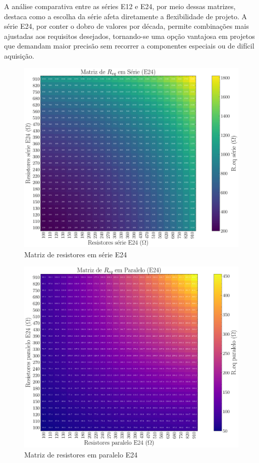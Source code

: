 \documentclass[conference]{IEEEtran}
\begin{document}
A análise comparativa entre as séries E12 e E24, por meio dessas matrizes, destaca como a escolha da série afeta diretamente a flexibilidade de projeto. A série E24, por conter o dobro de valores por década, permite combinações mais ajustadas aos requisitos desejados, tornando-se uma opção vantajosa em projetos que demandam maior precisão sem recorrer a componentes especiais ou de difícil aquisição.


\begin{figure}[htbp]
    \centering
    \caption{Matriz de resistores em série E24}
    \label{fig:matriz_serie_e24}
    \includegraphics[width=0.8\linewidth]{figures/matriz_serie_e24.pdf}
\end{figure}

\begin{figure}[htbp]
    \centering
    \caption{Matriz de resistores em paralelo E24}
    \label{fig:matriz_paralelo_e24}
    \includegraphics[width=0.8\linewidth]{figures/matriz_paralelo_e24.pdf}
\end{figure}
\end{document}
